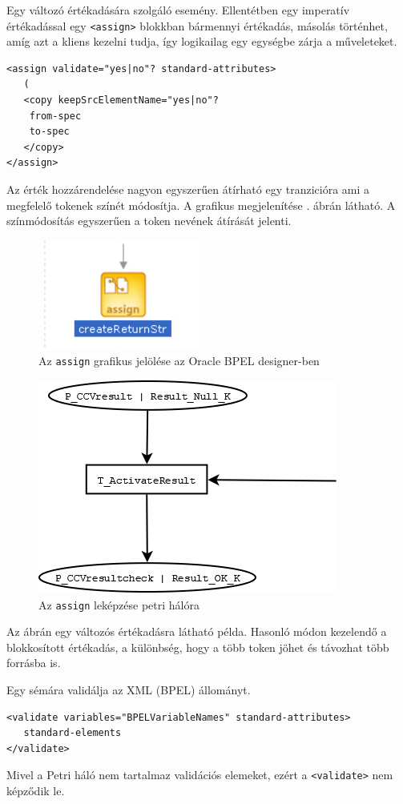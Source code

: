 Egy változó értékadására szolgáló esemény. Ellentétben egy imperatív értékadással egy \texttt{<assign>} blokkban bármennyi értékadás, másolás történhet, amíg azt a kliens kezelni tudja, így logikailag egy egységbe zárja a műveleteket.  
\begin{verbatim}
<assign validate="yes|no"? standard-attributes>
   (
   <copy keepSrcElementName="yes|no"? 
  	from-spec
  	to-spec
   </copy>
</assign>
\end{verbatim}
Az érték hozzárendelése nagyon egyszerűen átírható egy tranzicióra ami a megfelelő tokenek színét módosítja. 
A grafikus megjelenítése . ábrán látható.
A színmódosítás egyszerűen a token nevének átírását jelenti. 
\begin{figure}[h!]
\centering
\includegraphics[scale=1]{images/assign.png}
\caption{Az \texttt{assign} grafikus jelölése az Oracle BPEL designer-ben}
\label{fig:assign}
\end{figure}

\begin{figure}[h!]
\centering
\includegraphics[scale=0.4]{images/assignnet.png}
\caption{Az \texttt{assign} leképzése petri hálóra}
\label{fig:assignnet}
\end{figure}
Az ábrán egy változós értékadásra látható példa. Hasonló módon kezelendő a  blokkosított értékadás, a különbség, hogy a több token jöhet és távozhat több forrásba is.

Egy sémára validálja az XML (BPEL) állományt. 
\begin{verbatim}
<validate variables="BPELVariableNames" standard-attributes>
   standard-elements
</validate>
\end{verbatim}
Mivel a Petri háló nem tartalmaz validációs elemeket, ezért a \texttt{<validate>} nem képződik le. 

